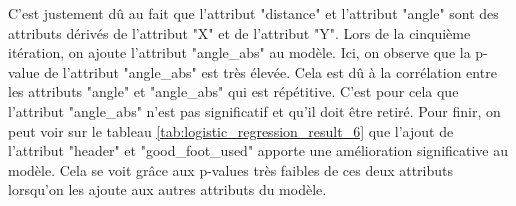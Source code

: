 \documentclass[12pt]{article}
\begin{document}
C'est justement dû au fait que l'attribut "distance" et l'attribut "angle" sont des attributs dérivés de l'attribut "X" et de l'attribut "Y".
\newline\newline
Lors de la cinquième itération, on ajoute l'attribut "angle\_abs" au modèle.
Ici, on observe que la p-value de l'attribut "angle\_abs" est très élevée.
Cela est dû à la corrélation entre les attributs "angle" et "angle\_abs" qui est répétitive.
C'est pour cela que l'attribut "angle\_abs" n'est pas significatif et qu'il doit être retiré.
\newline\newline
Pour finir, on peut voir sur le tableau \ref{tab:logistic_regression_result_6} que l'ajout de l'attribut "header" et "good\_foot\_used" apporte une amélioration significative au modèle.
Cela se voit grâce aux p-values très faibles de ces deux attributs lorsqu'on les ajoute aux autres attributs du modèle.
\end{document}
